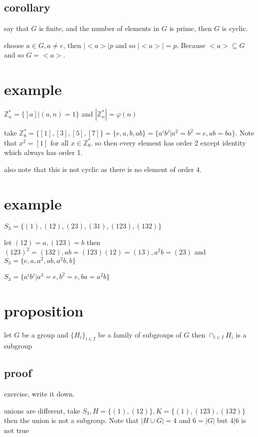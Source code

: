 \documentclass[letterpaper]{article}
\begin{document}
\subsection*{corollary}
say that $G$ is finite, and the number of elements in $G$ is prime, then $G$ is cyclic.

choose $a\in G, a\ne e$, then $|<a>|p$ and so $|<a>|=p$. Because $<a>\subseteq G$ and so $G=<a>$. 

\section*{example}
$\mathbb{Z}_n^*=\{[a]|(a,n)=1\}$ and $|\mathbb{Z}_n^*|=\varphi(n)$

take $\mathbb{Z}_8^*=\{[1],[3],[5],[7]\}=\{e,a,b,ab\}=\{a^ib^j|a^2=b^2=e,ab=ba\}$. Note that $x^2=[1]$ for all $x\in \mathbb{Z}_8^*$. so then every element has order 2 except identity which always has order 1.

also note that this is not cyclic as there is no element of order $4$.

\section*{example}
$S_3=\{(1),(12),(23),(31),(123),(132)\}$

let $(12)=a, (123)=b$ then $(123)^2=(132), ab=(123)(12)=(13), a^2b=(23)$ and $S_3=\{e,a,a^2,ab,a^2b,b\}$

$S_3=\{a^ib^j|a^3=e,b^2=e,ba=a^2b\}$

\section*{proposition}
let $G$ be a group and $\{H_i\}_{i\in I}$ be a family of subgroups of $G$ then $\cap_{i\in I}H_i$ is a subgroup

\subsection*{proof}
exercise, write it down.

unions are different, take $S_3, H=\{(1),(12)\}, K=\{(1),(123),(132)\}$ then the union is not a subgroup. Note that $|H\cup G|=4$ and $6=|G|$ but $4|6$ is not true
\end{document}
